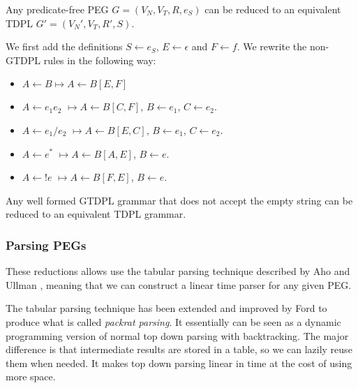 \begin{frame}
	Any predicate-free PEG $G = (V_N,V_T,R,e_S)$ can be reduced  to an equivalent TDPL $G' = (V_N',V_T,R',S)$.
	
	\begin{block}{}
		We first add the definitions $S \leftarrow e_S$, $E \leftarrow \epsilon$ and $F \leftarrow f$. We rewrite the non-GTDPL rules in the following way:\begin{itemize}
			\item $A \leftarrow B \longmapsto  A \leftarrow B[E, F]$
			\item $A \leftarrow e_1e_2$ $\longmapsto A \leftarrow B[C, F]$, $ B \leftarrow e_1$, $C \leftarrow e_2$.
			\item $A \leftarrow e_1/e_2$ $\longmapsto A \leftarrow B[E, C]$, $ B \leftarrow e_1$, $C \leftarrow e_2$.
			\item $A \leftarrow e^*$ $\longmapsto A \leftarrow B[A, E]$, $ B \leftarrow e$.
			\item $A \leftarrow !e$ $\longmapsto A \leftarrow B[F, E]$, $ B \leftarrow e$.
		\end{itemize}
	\end{block}

	Any well formed GTDPL  grammar that does not accept the empty string  can be reduced to an equivalent TDPL grammar.
\end{frame}

\begin{frame}
	\frametitle{Parsing PEGs}
These reductions allows  use the tabular parsing technique described by Aho and Ullman \cite{10.5555/578789}, meaning that we can construct a linear time parser for any given PEG.
	
	\begin{block}{}
		 The tabular parsing technique has been extended and improved by Ford to produce what is called \emph{packrat parsing}\cite{ford2002packrat}. It essentially can be seen as a dynamic programming version of normal top down parsing with backtracking. The major difference is that intermediate results are stored in a table, so we can lazily reuse them when needed. It makes top down parsing linear in time at the cost of using more space.
	\end{block}
\end{frame}